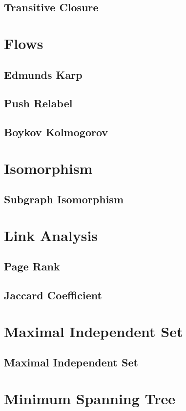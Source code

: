 \subsection{Transitive Closure}

\section{Flows}
\subsection{Edmunds Karp}
\subsection{Push Relabel}
\subsection{Boykov Kolmogorov}

\section{Isomorphism}
\subsection{Subgraph Isomorphism}

\section{Link Analysis}
\subsection{Page Rank}
\subsection{Jaccard Coefficient}

\section{Maximal Independent Set}
\subsection{Maximal Independent Set}

\section{Minimum Spanning Tree}
